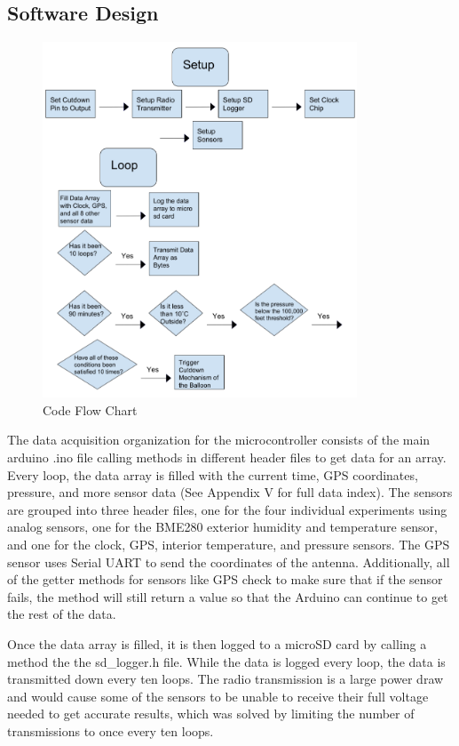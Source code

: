 \documentclass[12pt,]{article}
\begin{document}
\subsection{Software Design}\label{software-design}

\begin{figure}[h]

{\centering \includegraphics[height=400px]{assets/flow_code} 

}

\caption{\label{fig:figs} Code Flow Chart}\label{fig:code_flow_chart}
\end{figure}

The data acquisition organization for the microcontroller consists of
the main arduino .ino file calling methods in different header files to
get data for an array. Every loop, the data array is filled with the
current time, GPS coordinates, pressure, and more sensor data (See
Appendix V for full data index). The sensors are grouped into three
header files, one for the four individual experiments using analog
sensors, one for the BME280 exterior humidity and temperature sensor,
and one for the clock, GPS, interior temperature, and pressure sensors.
The GPS sensor uses Serial UART to send the coordinates of the antenna.
Additionally, all of the getter methods for sensors like GPS check to
make sure that if the sensor fails, the method will still return a value
so that the Arduino can continue to get the rest of the data.

Once the data array is filled, it is then logged to a microSD card by
calling a method the the sd\_logger.h file. While the data is logged
every loop, the data is transmitted down every ten loops. The radio
transmission is a large power draw and would cause some of the sensors
to be unable to receive their full voltage needed to get accurate
results, which was solved by limiting the number of transmissions to
once every ten loops.
\end{document}

